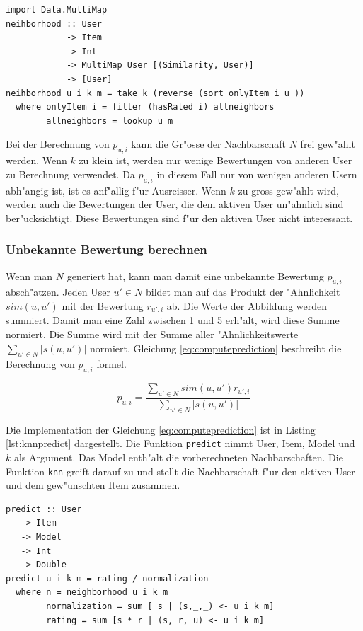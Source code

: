 \documentclass[a4paper, 12pt]{article}
\begin{document}
\begin{lstlisting}[caption=Funktion um die Nachbarschaft f"ur ein User und ein Item zu abzufragen, label=lst:neighborhood]
import Data.MultiMap
neihborhood :: User
            -> Item
            -> Int
            -> MultiMap User [(Similarity, User)]
            -> [User]
neihborhood u i k m = take k (reverse (sort onlyItem i u ))
  where onlyItem i = filter (hasRated i) allneighbors
        allneighbors = lookup u m
\end{lstlisting}

Bei der Berechnung von $p_{u,i}$ kann die Gr"osse der Nachbarschaft $N$ frei gew"ahlt werden. Wenn $k$ zu klein ist, werden nur wenige Bewertungen von anderen User zu Berechnung verwendet. Da $p_{u,i}$ in diesem Fall nur von wenigen anderen Usern abh"angig ist, ist es anf"allig f"ur Ausreisser. Wenn $k$ zu gross gew"ahlt wird, werden auch die Bewertungen der User, die dem aktiven User un"ahnlich sind ber"ucksichtigt. Diese Bewertungen sind f"ur den aktiven User nicht interessant. 

\subsubsection{Unbekannte Bewertung berechnen}
\label{sec:predict}

Wenn man $N$ generiert hat, kann man damit eine unbekannte Bewertung $p_{u,i}$ absch"atzen. Jeden User $u' \in N$ bildet man auf das Produkt der "Ahnlichkeit $sim(u,u')$ mit der Bewertung $r_{u',i}$ ab. Die Werte der Abbildung werden summiert. Damit man eine Zahl zwischen 1 und 5 erh"alt, wird diese Summe normiert. Die Summe wird mit der Summe aller "Ahnlichkeitswerte $\sum_{u' \in N}{|s(u,u')|}$ normiert. Gleichung \ref{eq:computeprediction} beschreibt die Berechnung von $p_{u,i}$ formel.

\begin{equation}
  \label{eq:computeprediction}
  p_{u,i} = \frac{\sum_{u' \in N}{sim(u,u') r_{u',i}}}{\sum_{u' \in N}{|s(u,u')|}}
\end{equation}

Die Implementation der Gleichung \ref{eq:computeprediction} ist in Listing \ref{lst:knnpredict} dargestellt. Die Funktion \verb|predict| nimmt User, Item, Model und $k$ als Argument. Das Model enth"alt die vorberechneten Nachbarschaften. Die Funktion \verb|knn| greift darauf zu und stellt die Nachbarschaft f"ur den aktiven User und dem gew"unschten Item zusammen.

\begin{lstlisting}[caption=Berechnung von $p_{u,i}$, label=lst:knnpredict]
  predict :: User
   -> Item
   -> Model
   -> Int
   -> Double
predict u i k m = rating / normalization
  where n = neighborhood u i k m
        normalization = sum [ s | (s,_,_) <- u i k m]
        rating = sum [s * r | (s, r, u) <- u i k m]
\end{lstlisting}
\end{document}

